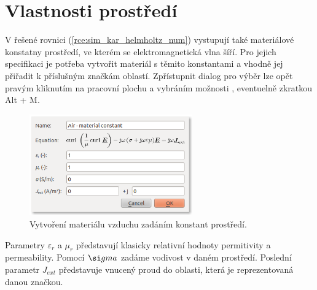 \section{Vlastnosti prostředí}
V řešené rovnici (\ref{rce:sim_kar_helmholtz_num}) vystupují také materiálové konstatny prostředí, ve kterém se elektromagnetická vlna šíří. Pro jejich specifikaci je potřeba vytvořit materiál s těmito konstantami a vhodně jej přiřadit k příslušným značkám oblastí. Zpřístupnit dialog pro výběr lze opět pravým kliknutím na pracovní plochu a vybráním možnosti , eventuelně zkratkou Alt + M. 
\begin{figure}[!h]
	\centering
	\includegraphics[width=7cm]{sim_material.png}
	\caption{Vytvoření materiálu vzduchu zadáním konstant prostředí.}
	\label{obr:sim_material}
\end{figure}
Parametry $\varepsilon_r$ a $\mu_r$ představují klasicky relativní hodnoty permitivity a permeability. Pomocí $\si
gma$ zadáme vodivost v daném prostředí. Poslední parametr $J_{ext}$ představuje vnucený proud do oblasti, která je reprezentovaná danou značkou.




